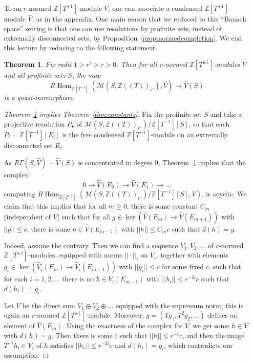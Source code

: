 \documentclass[11pt]{amsbook}
\DeclareMathOperator{\Hom}{Hom}
\numberwithin{equation}{section}
\newtheorem{theorem}{Theorem}
\numberwithin{theorem}{section}
\theoremstyle{definition}
\begin{document}
To an $r$-normed $\mathbb Z[T^{\pm 1}]$-module $V$, one can associate a condensed $\mathbb Z[T^{\pm 1}]$-module $\widehat{V}$, as in the appendix. One main reason that we reduced to this ``Banach space'' setting is that one can use resolutions by profinite sets, instead of extremally disconnected sets, by Proposition~\ref{prop:normedcompletion}. We end this lecture by reducing to the following statement.

\begin{theorem}\label{thm:banachcomplete} Fix radii $1>r'>r>0$. Then for all $r$-normed $\mathbb Z[T^{\pm 1}]$-modules $V$ and all profinite sets $S$, the map
\[
R\Hom_{\mathbb Z[T^{-1}]}(\mathcal M(S,\mathbb Z((T))_{r'}),\widehat{V})\to \widehat{V}(S)
\]
is a quasi-isomorphism.
\end{theorem}

\begin{proof}[Theorem~\ref{thm:banachcomplete} implies Theorem~\ref{thm:constants}] Fix the profinite set $S$ and take a projective resolution $P_\bullet$ of $\mathcal M(S,\mathbb Z((T))_{r'})/\mathbb Z[T^{-1}][S]$, so that each $P_i=\mathbb Z[T^{-1}][E_i]$ is the free condensed $\mathbb Z[T^{-1}]$-module on an extremally disconnected set $E_i$.

As $R\Gamma(S,\widehat{V})=\widehat{V}(S)$ is concentrated in degree $0$, Theorem~\ref{thm:banachcomplete} implies that the complex
\[
0\to \widehat{V}(E_0)\to \widehat{V}(E_1)\to \ldots
\]
computing $R\Hom_{\mathbb Z[T^{-1}]}(\mathcal M(S,\mathbb Z((T))_{r'})/\mathbb Z[T^{-1}][S],V)$, is acyclic. We claim that this implies that for all $m\geq 0$, there is some constant $C_m$ (independent of $V$) such that for all $g\in \ker(\widehat{V}(E_m)\to \widehat{V}(E_{m+1}))$ with $||g||\leq c$, there is some $h\in \widehat{V}(E_{m-1})$ with $||h||\leq C_mc$ such that $d(h)=g$.

Indeed, assume the contrary. Then we can find a sequence $V_1,V_2,\ldots$ of $r$-normed $\mathbb Z[T^{\pm 1}]$-modules, equipped with norms $||\cdot||_i$ on $V_i$, together with elements $g_i\in \ker(\widehat{V}_i(E_m)\to \widehat{V}_i(E_{m+1}))$ with $||g_i||\leq c$ for some fixed $c$, such that for each $i=1,2,\ldots$ there is no $h\in V_i(E_{m-1})$ with $||h_i||\leq r^{-2i}c$ such that $d(h_i)=g_i$.

Let $V$ be the direct sum $V_1\oplus V_2\oplus \ldots$ equipped with the supremum norm; this is again an $r$-normed $\mathbb Z[T^{\pm 1}]$-module. Moreover, $g=(Tg_1,T^2g_2,\ldots)$ defines an element of $\widehat{V}(E_m)$. Using the exactness of the complex for $V$, we get some $h\in V$ with $d(h)=g$. Then there is some $i$ such that $||h||\leq r^{-i}c$, and then the image $T^{-i}h_i\in V_i$ of $h$ satisfies $||h_i||\leq r^{-2i}c$ and $d(h_i)=g_i$, which contradicts our assumption.


\end{proof}
\end{document}
